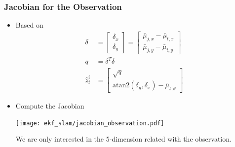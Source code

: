 \begin{frame}
    \frametitle{Jacobian for the Observation}

    \begin{itemize}
        \item Based on
        \begin{align*}
            \delta &= 
            \begin{bmatrix}
                \delta_x \\
                \delta_y
            \end{bmatrix}
            = \begin{bmatrix}
                \bar{\mu}_{j,x} - \bar{\mu}_{t,x} \\
                \bar{\mu}_{j,y} - \bar{\mu}_{t,y}
            \end{bmatrix}\\
            q &= \delta^T \delta\\
            \hat{z}^i_t &= 
            \begin{bmatrix}
                \sqrt{q} \\
                \text{atan2}(\delta_y, \delta_x) - \bar{\mu}_{t,\theta}
            \end{bmatrix}
        \end{align*}    
        \item Compute the Jacobian
        \begin{center}
            \texttt{[image: ekf\_slam/jacobian\_observation.pdf]}
        \end{center}

        We are only interested in the 5-dimension related with the observation.

    \end{itemize}
\end{frame}

